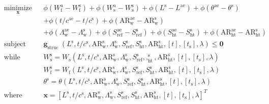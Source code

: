 \documentclass[11pt]{article}
\begin{document}
\begin{equation*}
    \begin{aligned}
        & \underset{\mathbf{x}}{\text{minimize}}
        & & \phi\left(W_{\mathrm{f}}^{\mathrm{a}}-W_{\mathrm{f}}^{\mathrm{s}}\right)+\phi\left(W_{\mathrm{s}}^{\mathrm{a}}-W_{\mathrm{s}}^{\mathrm{s}}\right)+\phi\left(L^{\mathrm{s}}-L^{\mathrm{ae}}\right)+\phi\left(\theta^{\mathrm{ae}}-\theta^{\mathrm{s}}\right) \\
    & & & +\phi\left(t / c^{\mathrm{ae}}-t / c^{\mathrm{s}}\right)+\phi\left(\mathrm{AR}_{\mathrm{w}}^{\mathrm{ae}}-\mathrm{AR}_{\mathrm{w}}^{\mathrm{s}}\right) \\
    & & & +\phi\left(\Lambda_{\mathrm{w}}^{\mathrm{ae}}-\Lambda_{\mathrm{w}}^{\mathrm{s}}\right)+\phi\left(S_{\mathrm{ref}}^{\mathrm{ae}}-S_{\mathrm{ref}}^{\mathrm{s}}\right)+\phi\left(S_{\mathrm{ht}}^{\mathrm{ae}}-S_{\mathrm{ht}}^{\mathrm{s}}\right)+\phi\left(\mathrm{AR}_{\mathrm{ht}}^{\mathrm{ae}}-\mathrm{AR}_{\mathrm{ht}}^{\mathrm{s}}\right) \\
    & \text{subject to}
        & & \mathbf{g}_{\text {struc }}\left(L^{\mathrm{s}}, t / c^{\mathrm{s}}, \mathrm{AR}_{\mathrm{w}}^{\mathrm{s}}, \Lambda_{\mathrm{w}}^{\mathrm{s}}, S_{\mathrm{ref}}^{\mathrm{s}}, S_{\mathrm{ht}}^{\mathrm{s}}, \mathrm{AR}_{\mathrm{ht}}^{\mathrm{s}},[t],\left[t_{\mathrm{s}}\right], \lambda\right) \leq \mathbf{0} \\
    & \text{while solving}
        & & W_{\mathrm{s}}^{\mathrm{s}}=W_{\mathrm{s}}\left(L^{\mathrm{s}}, t / c^{\mathrm{s}}, \mathrm{AR}_{\mathrm{w}}^{\mathrm{s}}, \Lambda_{\mathrm{w}}^{\mathrm{s}}, S_{\mathrm{ref}}^{\mathrm{s}},,_{\mathrm{ht}}^{\mathrm{s}}, \mathrm{AR}_{\mathrm{ht}}^{\mathrm{s}},[t],\left[t_{\mathrm{s}}\right], \lambda\right) \\
    & & & W_{\mathrm{f}}^{\mathrm{s}}=W_{\mathrm{f}}\left(L^{\mathrm{s}}, t / c^{\mathrm{s}}, \mathrm{AR}_{\mathrm{w}}^{\mathrm{s}}, \Lambda_{\mathrm{w}}^{\mathrm{s}}, S_{\mathrm{ref}}^{\mathrm{s}}, S_{\mathrm{ht}}^{\mathrm{s}}, \mathrm{AR}_{\mathrm{ht}}^{\mathrm{s}},[t],\left[t_{\mathrm{s}}\right], \lambda\right) \\
    & & & \theta^{\mathrm{s}}=\theta\left(L^{\mathrm{s}}, t / c^{\mathrm{s}}, \mathrm{AR}_{\mathrm{w}}^{\mathrm{s}}, \Lambda_{\mathrm{w}}^{\mathrm{s}}, S_{\mathrm{ref}}^{\mathrm{s}}, S_{\mathrm{ht}}^{\mathrm{s}}, \mathrm{AR}_{\mathrm{ht}}^{\mathrm{s}},[t],\left[t_{\mathrm{s}}\right], \lambda\right)\\
    & \text{where}
        & & \mathbf{x} = \left[L^{\mathrm{s}}, t / c^{\mathrm{s}}, \mathrm{AR}_{\mathrm{w}}^{\mathrm{s}}, \Lambda_{\mathrm{w}}^{\mathrm{s}}, S_{\mathrm{ref}}^{\mathrm{s}}, S_{\mathrm{ht}}^{\mathrm{s}}, \mathrm{AR}_{\mathrm{ht}}^{\mathrm{s}},[t],\left[t_{\mathrm{s}}\right], \lambda\right]^\textit{T}
    \end{aligned}
\end{equation*}
\end{document}
